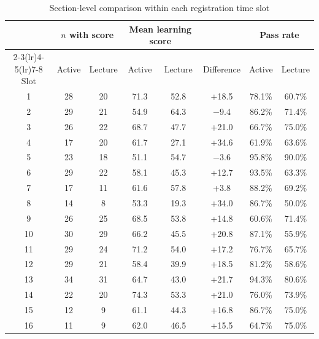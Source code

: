 \begin{table}[h!]
\centering\small\setlength{\tabcolsep}{5pt}
\caption{Section-level comparison within each registration time slot}
\label{tab:pairs}
\begin{tabular}{cccccccc}
\toprule
& \multicolumn{2}{c}{$n$ with score} & \multicolumn{2}{c}{Mean learning score} & & \multicolumn{2}{c}{Pass rate} \\
\cmidrule(lr){2-3}\cmidrule(lr){4-5}\cmidrule(lr){7-8}
Slot & Active & Lecture & Active & Lecture & Difference & Active & Lecture \\
\midrule
1 & 28 & 20 & 71.3 & 52.8 & +18.5 & 78.1\% & 60.7\% \\
2 & 29 & 21 & 54.9 & 64.3 & $-$9.4 & 86.2\% & 71.4\% \\
3 & 26 & 22 & 68.7 & 47.7 & +21.0 & 66.7\% & 75.0\% \\
4 & 17 & 20 & 61.7 & 27.1 & +34.6 & 61.9\% & 63.6\% \\
5 & 23 & 18 & 51.1 & 54.7 & $-$3.6 & 95.8\% & 90.0\% \\
6 & 29 & 22 & 58.1 & 45.3 & +12.7 & 93.5\% & 63.3\% \\
7 & 17 & 11 & 61.6 & 57.8 & +3.8 & 88.2\% & 69.2\% \\
8 & 14 & 8 & 53.3 & 19.3 & +34.0 & 86.7\% & 50.0\% \\
9 & 26 & 25 & 68.5 & 53.8 & +14.8 & 60.6\% & 71.4\% \\
10 & 30 & 29 & 66.2 & 45.5 & +20.8 & 87.1\% & 55.9\% \\
11 & 29 & 24 & 71.2 & 54.0 & +17.2 & 76.7\% & 65.7\% \\
12 & 29 & 21 & 58.4 & 39.9 & +18.5 & 81.2\% & 58.6\% \\
13 & 34 & 31 & 64.7 & 43.0 & +21.7 & 94.3\% & 80.6\% \\
14 & 22 & 20 & 74.3 & 53.3 & +21.0 & 76.0\% & 73.9\% \\
15 & 12 & 9 & 61.1 & 44.3 & +16.8 & 86.7\% & 75.0\% \\
16 & 11 & 9 & 62.0 & 46.5 & +15.5 & 64.7\% & 75.0\% \\
\bottomrule
\end{tabular}
\end{table}
